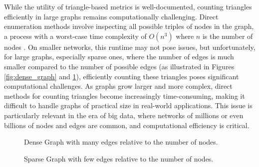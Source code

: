 \documentclass[11pt]{article}
\begin{document}
While the utility of triangle-based metrics is well-documented, counting triangles efficiently in large graphs remains computationally challenging.
Direct enumeration methods involve inspecting all possible triples of nodes in the graph, a process with a worst-case time complexity of $O(n^3)$ where $n$ is the number of nodes \cite{al_hasan_triangle_2018}.
On smaller networks, this runtime may not pose issues, but unfortunately, for large graphs, especially sparse ones, where the number of edges is much smaller compared to the number of possible edges (as illustrated in Figures \ref{fig:dense_graph} and \ref{fig:sparse_graph}), efficiently counting these triangles poses significant computational challenges.
As graphs grow larger and more complex, direct methods for counting triangles become increasingly time-consuming, making it difficult to handle graphs of practical size in real-world applications.
This issue is particularly relevant in the era of big data, where networks of millions or even billions of nodes and edges are common, and computational efficiency is critical.

\begin{figure}[H]
    \centering
    \begin{minipage}{0.45\textwidth}
        \centering
        \caption{Dense Graph with many edges relative to the number of nodes.}
        \label{fig:dense_graph}
    \end{minipage}%
    \hspace{0.5cm}
    \begin{minipage}{0.45\textwidth}
        \centering
        \caption{Sparse Graph with few edges relative to the number of nodes.}
        \label{fig:sparse_graph}
    \end{minipage}
\end{figure}
\end{document}

